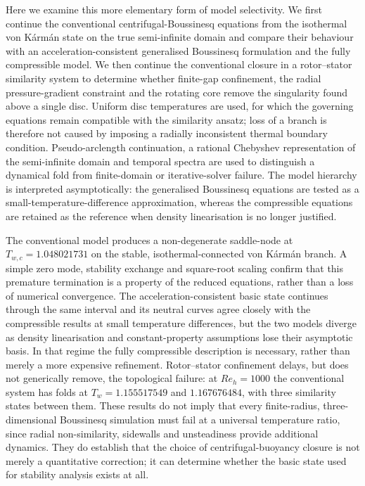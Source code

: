 Here we examine this more elementary form of model selectivity.  We first
continue the conventional centrifugal-Boussinesq equations from the isothermal
von K\'arm\'an state on the true semi-infinite domain and compare their behaviour
with an acceleration-consistent generalised Boussinesq formulation and the
fully compressible model.  We then continue the conventional closure in a
rotor--stator similarity system to determine whether finite-gap confinement,
the radial pressure-gradient constraint and the rotating core remove the
singularity found above a single disc.  Uniform disc temperatures are used, for
which the governing equations remain compatible with the similarity ansatz;
loss of a branch is therefore not caused by imposing a radially inconsistent
thermal boundary condition.  Pseudo-arclength continuation, a rational
Chebyshev representation of the semi-infinite domain and temporal spectra are
used to distinguish a dynamical fold from finite-domain or iterative-solver
failure.  The model hierarchy is interpreted asymptotically: the generalised
Boussinesq equations are tested as a small-temperature-difference approximation,
whereas the compressible equations are retained as the reference when density
linearisation is no longer justified.

The conventional model produces a non-degenerate saddle-node at
$T_{w,c}=1.048021731$ on the stable, isothermal-connected von K\'arm\'an branch.
A simple zero mode, stability exchange and square-root scaling confirm that
this premature termination is a property of the reduced equations, rather than
a loss of numerical convergence.  The acceleration-consistent basic state
continues through the same interval and its neutral curves agree closely with
the compressible results at small temperature differences, but the two models
diverge as density linearisation and constant-property assumptions lose their
asymptotic basis.  In that regime the fully compressible description is
necessary, rather than merely a more expensive refinement.  Rotor--stator
confinement delays, but does not generically remove, the topological failure:
at $Re_h=1000$ the conventional system has folds at $T_w=1.155517549$ and
$1.167676484$, with three similarity states between them.  These results do not
imply that every finite-radius, three-dimensional Boussinesq simulation must
fail at a universal temperature ratio, since radial non-similarity, sidewalls
and unsteadiness provide additional dynamics.  They do establish that the
choice of centrifugal-buoyancy closure is not merely a quantitative correction;
it can determine whether the basic state used for stability analysis exists at
all.
